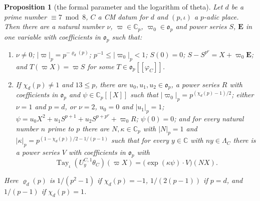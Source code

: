 \documentclass[11pt,a4paper]{article}
\theoremstyle{plainx}
\newtheorem{proposition}[theorem]{Proposition}
\theoremstyle{uprightx}
\newcommand{\CC}{\mathbb{C}}
\newcommand{\Cp}{\CC_p}
\newcommand{\op}{\mathfrak{o}_p}
\newcommand{\np}[1]{|#1|_p}
\newcommand{\chid}[1]{\chi_{#1}}
\newcommand{\nsw}[2]{\varrho_{#1}(#2)}
\newcommand{\LamC}[1]{\Lambda_{#1}}
\newcommand{\thC}[1]{\theta_{#1}}
\newcommand{\phC}[1]{\varphi_{#1}}
\newcommand{\UC}[3]{U^{#1,#2}_{#3}}
\newcommand{\tayj}[1]{\operatorname{Tay}_\iota(#1)}
\newcommand{\phiring}[1]{\op[[\phC{#1}]]}
\begin{document}
\begin{proposition}[the formal parameter and the logarithm of theta]\label{p:formal}
Let $d$ be a prime number $\equiv7\bmod8$, $C$ a CM datum for $d$ and $(p,\iota)$ a $p$-adic place. Then there are a
natural number $\nu$, $\varpi\in\Cp$, $\varpi_0\in\op$ and power series $S$, $\mathbf{E}$ in one variable with coefficients in
$\op$ such that:
\begin{enumerate}[label=(\Roman*),itemsep=2pt]
\item $\nu\ne0$; $\np{\varpi}=p^{-\nsw{d}{p}}$; $p^{-1}\le\np{\varpi_0}<1$; $S(0)=0$; $S-S^{p^\nu}=X+\varpi_0 \mathbf{E}$; and
$T(\varpi X)=\varpi S$ for some $T\in\phiring{C}$.
\item If $\chid{d}(p)\ne1$ and $13\le p$, there are $u_0,u_1,u_2\in\op$, a power series $R$ with coefficients in
$\op$ and $\psi\in\Cp[[X]]$ such that $\np{\varpi_0}=p^{(\chid{d}(p)-1)/2}$; either $\nu=1$ and $p=d$, or $\nu=2$,
$u_0=0$ and $\np{u_1}=1$; $\psi=u_0X^2+u_1S^{p+1}+u_2S^{p+p^\nu}+\varpi_0 R$; $\psi(0)=0$; and for every natural number
$n$ prime to $p$ there are $N,\kappa\in\Cp$ with $\np{N}=1$ and $\np{\kappa}=p^{(1-\chid{d}(p))/2-1/(p-1)}$ such that
for every $y\in\CC$ with $ny\in\LamC{C}$ there is a power series $V$ with coefficients in $\op$ with
\[\tayj{\UC{C}{1}{y}\thC{C}}(\varpi X)=\bigl(\exp(\kappa\psi)\cdot V\bigr)(NX) .\]
\end{enumerate}
Here $\nsw{d}{p}$ is $1/(p^2-1)$ if $\chid{d}(p)=-1$, $1/(2(p-1))$ if $p=d$, and $1/(p-1)$ if $\chid{d}(p)=1$.
\end{proposition}
\end{document}
